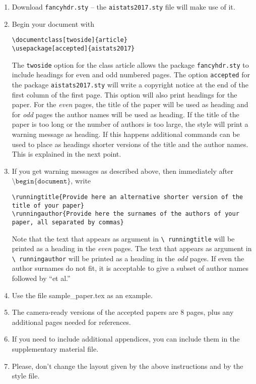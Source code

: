 \documentclass[twoside]{article}
\begin{document}
\begin{enumerate}
    \item Download \texttt{fancyhdr.sty} -- the
    \texttt{aistats2017.sty} file will make use of it.
    \item Begin your document with
    \begin{flushleft}
    \texttt{\textbackslash documentclass[twoside]\{article\}}\\
    \texttt{\textbackslash usepackage[accepted]\{aistats2017\}}
    \end{flushleft}
    The \texttt{twoside} option for the class article allows the
    package \texttt{fancyhdr.sty} to include headings for even and odd
    numbered pages. The option \texttt{accepted} for the package
    \texttt{aistats2017.sty} will write a copyright notice at the end of
    the first column of the first page. This option will also print
    headings for the paper.  For the \emph{even} pages, the title of
    the paper will be used as heading and for \emph{odd} pages the
    author names will be used as heading.  If the title of the paper
    is too long or the number of authors is too large, the style will
    print a warning message as heading. If this happens additional
    commands can be used to place as headings shorter versions of the
    title and the author names. This is explained in the next point.
    \item  If you get warning messages as described above, then
    immediately after $\texttt{\textbackslash
    begin\{document\}}$, write
    \begin{flushleft}
    \texttt{\textbackslash runningtitle\{Provide here an alternative shorter version of the title of your
    paper\}}\\
    \texttt{\textbackslash runningauthor\{Provide here the surnames of the authors of your paper, all separated by
    commas\}}
    \end{flushleft}
    Note that the text that appears as argument in \texttt{\textbackslash
      runningtitle} will be printed as a heading in the \emph{even}
    pages. The text that appears as argument in \texttt{\textbackslash
      runningauthor} will be printed as a heading in the \emph{odd}
    pages.  If even the author surnames do not fit, it is acceptable
    to give a subset of author names followed by ``et al.''

    \item Use the file sample\_paper.tex as an example.

    \item The camera-ready versions of the accepted papers are 8
      pages, plus any additional pages needed for references.

    \item If you need to include additional appendices,
      you can include them in the supplementary
      material file.

    \item Please, don't change the layout given by the above
      instructions and by the style file.

\end{enumerate}
\end{document}
